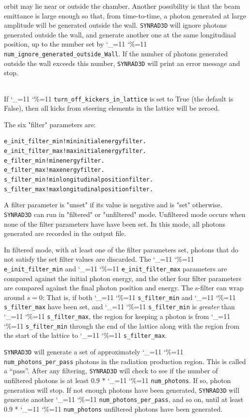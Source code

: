 \documentclass[11pt]{article}
\newcommand{\srthree}{\texttt{SYNRAD3D}\xspace}
\newcommand\ttcmd{\begingroup\catcode`\_=11 \catcode`\%=11 \dottcmd}
\newcommand\dottcmd[1]{\texttt{#1}\endgroup}
\newcommand{\vn}{\ttcmd}
\newcommand{\Newline}{\hfil \\}
\newlength{\ExBeg}
\newlength{\ExEnd}
\newenvironment{example}
  {\vspace{\ExBeg} \begin{alltt}}
  {\end{alltt} \vspace{\ExEnd}}
\begin{document}
\begin{description}
orbit may lie near or outside the chamber. Another possibility is that
the beam emittance is large enough so that, from time-to-time, a
photon generated at large amplitude will be generated outside the
wall. \srthree will ignore photons generated outside the wall, and
generate another one at the same longitudinal position, up to the
number set by \vn{num_ignore_generated_outside_Wall}. If the number of
photons generated outside the wall exceeds this number, \srthree will
print an error message and stop.
  \item[\vn{turn_off_kickers_in_lattice}] \Newline
If \vn{turn_off_kickers_in_lattice} is set to True (the default is
False), then all kicks from steering elements in the lattice will be zeroed.

\end{description}

The six "filter" parameters are:
\begin{example}
  e_init_filter_min   ! min initial energy filter.
  e_init_filter_max   ! max initial energy filter.
  e_filter_min        ! min energy filter.
  e_filter_max        ! max energy filter.
  s_filter_min        ! min longitudinal position filter.
  s_filter_max        ! max longitudinal position filter.
\end{example}
A filter parameter is "unset" if its value is negative and is "set"
otherwise.  \srthree can run in "filtered" or "unfiltered"
mode. Unfiltered mode occurs when none of the filter parameters have
have been set. In this mode, all photons generated are recorded in
the output file.

In filtered mode, with at least one of the filter parameters set,
photons that do not satisfy the set filter values are discarded. The
\vn{e_init_filter_min} and \vn{e_init_filter_max} parameters are 
compared against the initial photon energy, and the other four
filter parameters are compared against the final photon position and
energy. The s-filter can wrap around $s = 0$: That is,
if both \vn{s_filter_min} and \vn{s_filter_max} have been set,
and \vn{s_filter_min} is {\em greater} than \vn{s_filter_max}, the region
for keeping a photon is from \vn{s_filter_min} through the end of the
lattice along with the region from the start of the lattice to
\vn{s_filter_max}.

\srthree will generate a set of approximately
\vn{num_photons_per_pass} photons in the radiation production region.
This is called a ``pass''.  After any filtering, \srthree will check
to see if the number of unfiltered photons is at least 0.9 *
\vn{num_photons}. If so, photon generation will stop. If not enough
photons have been generated, \srthree will generate another
\vn{num_photons_per_pass}, and so on, until at least 0.9 *
\vn{num_photons} unfiltered photons have been generated.
\end{document}
